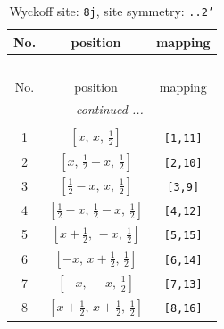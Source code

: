 \documentclass[fleqn,8pt]{jsarticle}
\begin{document}
\begin{longtable}{ccc}
\caption{Wyckoff site: {\tt 8j}, site symmetry: {\tt ..2'}}
 \\
 \hline \hline
No. & position & mapping \\ \hline \endfirsthead

\multicolumn{2}{l}{\tablename\ \thetable{}} \\
 \hline \hline
No. & position & mapping \\ \hline \endhead

 \hline \hline
\multicolumn{2}{r}{\footnotesize\it continued ...} \\ \endfoot

 \hline \hline
\multicolumn{2}{r}{} \\ \endlastfoot

1 & $\left[ x,\, x,\, \frac{1}{2} \right]$ & {\tt [1,11]} \\ \hline
2 & $\left[ x,\, \frac{1}{2} - x,\, \frac{1}{2} \right]$ & {\tt [2,10]} \\ \hline
3 & $\left[ \frac{1}{2} - x,\, x,\, \frac{1}{2} \right]$ & {\tt [3,9]} \\ \hline
4 & $\left[ \frac{1}{2} - x,\, \frac{1}{2} - x,\, \frac{1}{2} \right]$ & {\tt [4,12]} \\ \hline
5 & $\left[ x + \frac{1}{2},\, - x,\, \frac{1}{2} \right]$ & {\tt [5,15]} \\ \hline
6 & $\left[ - x,\, x + \frac{1}{2},\, \frac{1}{2} \right]$ & {\tt [6,14]} \\ \hline
7 & $\left[ - x,\, - x,\, \frac{1}{2} \right]$ & {\tt [7,13]} \\ \hline
8 & $\left[ x + \frac{1}{2},\, x + \frac{1}{2},\, \frac{1}{2} \right]$ & {\tt [8,16]} \\
\end{longtable}
\renewcommand{\arraystretch}{1.2}
\end{document}
